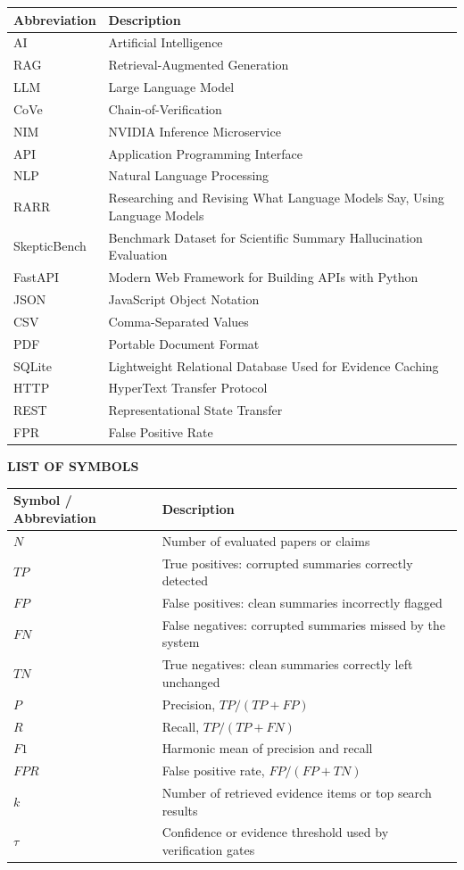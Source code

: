 \documentclass[12pt, a4paper]{report}
\begin{document}
\begin{tabular}{L{3cm} L{9cm}}
\toprule
\textbf{Abbreviation} & \textbf{Description} \\
\midrule
AI & Artificial Intelligence \\
RAG & Retrieval-Augmented Generation \\
LLM & Large Language Model \\
CoVe & Chain-of-Verification \\
NIM & NVIDIA Inference Microservice \\
API & Application Programming Interface \\
NLP & Natural Language Processing \\
RARR & Researching and Revising What Language Models Say, Using Language Models \\
SkepticBench & Benchmark Dataset for Scientific Summary Hallucination Evaluation \\
FastAPI & Modern Web Framework for Building APIs with Python \\
JSON & JavaScript Object Notation \\
CSV & Comma-Separated Values \\
PDF & Portable Document Format \\
SQLite & Lightweight Relational Database Used for Evidence Caching \\
HTTP & HyperText Transfer Protocol \\
REST & Representational State Transfer \\
FPR & False Positive Rate \\
\bottomrule
\end{tabular}

\cleardoublepage

\newpage
\begin{center}
    {\fontsize{16}{20}\bfseries LIST OF SYMBOLS}
\end{center}
\vspace{1cm}
\onehalfspacing

\begin{tabular}{L{3cm} L{9cm}}
\toprule
\textbf{Symbol / Abbreviation} & \textbf{Description} \\
\midrule
$N$ & Number of evaluated papers or claims \\
$TP$ & True positives: corrupted summaries correctly detected \\
$FP$ & False positives: clean summaries incorrectly flagged \\
$FN$ & False negatives: corrupted summaries missed by the system \\
$TN$ & True negatives: clean summaries correctly left unchanged \\
$P$ & Precision, $TP/(TP+FP)$ \\
$R$ & Recall, $TP/(TP+FN)$ \\
$F1$ & Harmonic mean of precision and recall \\
$FPR$ & False positive rate, $FP/(FP+TN)$ \\
$k$ & Number of retrieved evidence items or top search results \\
$\tau$ & Confidence or evidence threshold used by verification gates \\
\bottomrule
\end{tabular}
\end{document}

